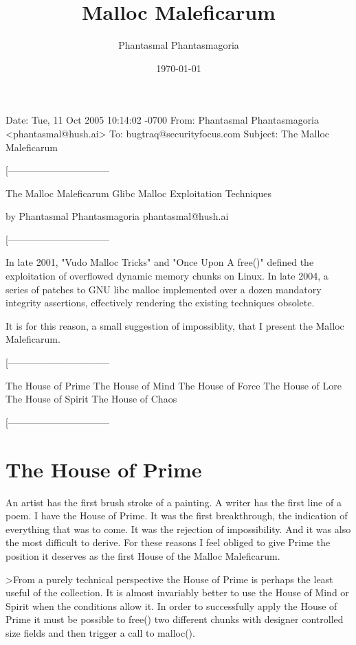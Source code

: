 \documentclass[12pt]{article}
\begin{document}
\title{Malloc Maleficarum}
\author{Phantasmal Phantasmagoria}
\date{\today}
\maketitle
\begin{verbnobox}[\small]
Date: Tue, 11 Oct 2005 10:14:02 -0700
From: Phantasmal Phantasmagoria <phantasmal@hush.ai>
To: bugtraq@securityfocus.com
Subject: The Malloc Maleficarum

[--------------------------------

The Malloc Maleficarum
Glibc Malloc Exploitation Techniques

by Phantasmal Phantasmagoria
phantasmal@hush.ai

[--------------------------------
\end{verbnobox}
In late 2001, "Vudo Malloc Tricks" and "Once Upon A free()" defined
the exploitation of overflowed dynamic memory chunks on Linux. In
late 2004, a series of patches to GNU libc malloc implemented over
a dozen mandatory integrity assertions, effectively rendering the
existing techniques obsolete.

It is for this reason, a small suggestion of impossiblity, that I
present the Malloc Maleficarum.
\begin{verbnobox}[\small]
[--------------------------------

          The House of Prime
          The House of Mind
          The House of Force
          The House of Lore
          The House of Spirit
          The House of Chaos

[--------------------------------
\end{verbnobox}

\section{The House of Prime}

An artist has the first brush stroke of a painting. A writer has
the first line of a poem. I have the House of Prime. It was the
first breakthrough, the indication of everything that was to come.
It was the rejection of impossibility. And it was also the most
difficult to derive. For these reasons I feel obliged to give Prime
the position it deserves as the first House of the Malloc
Maleficarum.

>From a purely technical perspective the House of Prime is perhaps
the least useful of the collection. It is almost invariably better
to use the House of Mind or Spirit when the conditions allow it. In
order to successfully apply the House of Prime it must be possible
to free() two different chunks with designer controlled size fields
and then trigger a call to malloc().
\end{document}
